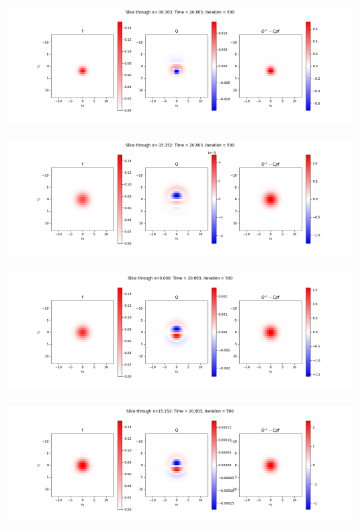 \documentclass{article}
\begin{document}
\begin{figure}[H]
  \begin{subfigure}[b]{\textwidth}
    \includegraphics[width=\textwidth]{imgs/ts_output2/slice0/mat500.png}
  \end{subfigure}
  \hfill
  \begin{subfigure}[b]{\textwidth}
    \includegraphics[width=\textwidth]{imgs/ts_output2/slice25/mat500.png}
  \end{subfigure}
  \hfill
  \begin{subfigure}[b]{\textwidth}
    \includegraphics[width=\textwidth]{imgs/ts_output2/slice50/mat500.png}
  \end{subfigure}
  \hfill
  \begin{subfigure}[b]{\textwidth}
    \includegraphics[width=\textwidth]{imgs/ts_output2/slice75/mat500.png}
  \end{subfigure}
\end{figure}
\end{document}
